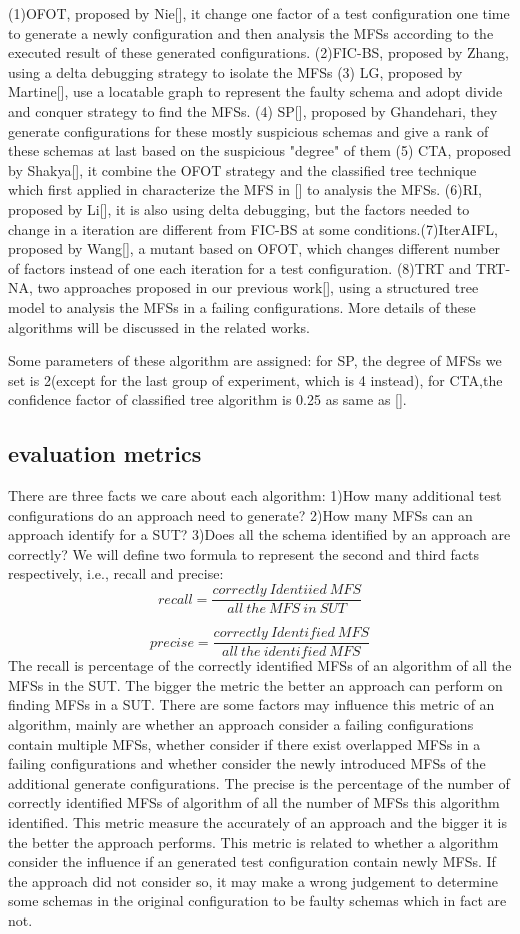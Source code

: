 \documentclass[10pt,journal,cspaper,compsoc]{IEEEtran}
\begin{document}
(1)OFOT, proposed by Nie[], it change one factor of a test configuration one time to generate a newly configuration and then analysis the MFSs according to the executed result of these generated configurations. (2)FIC-BS, proposed by Zhang, using a delta debugging strategy to isolate the MFSs (3) LG, proposed by Martine[], use a locatable graph to represent the faulty schema and adopt divide and conquer strategy to find the MFSs. (4) SP[], proposed by Ghandehari, they generate configurations for these mostly suspicious schemas and give a rank of these schemas at last based on the suspicious "degree" of them (5) CTA, proposed by Shakya[], it combine the OFOT strategy and the classified tree technique which first applied in characterize the MFS in [] to analysis the MFSs. (6)RI, proposed by Li[], it is also using delta debugging, but the factors needed to change in a iteration are different from FIC-BS at some conditions.(7)IterAIFL, proposed by Wang[], a mutant based on OFOT, which changes different number of factors instead of one each iteration for a test configuration. (8)TRT and TRT-NA, two approaches proposed in our previous work[], using a structured tree model to analysis the MFSs in a failing configurations.  More details of these algorithms will be discussed in the related works.

Some parameters of these algorithm are assigned: for SP, the degree of MFSs we set is 2(except for the last group of experiment, which is 4 instead), for CTA,the confidence factor of classified tree algorithm is 0.25 as same as [].
\subsection{evaluation metrics}
There are three facts we care about each algorithm: 1)How many additional test configurations do an approach need to generate? 2)How many MFSs can an approach identify for a SUT? 3)Does all the schema identified by an approach are correctly? We will define two formula to represent the second and third facts respectively, i.e., recall and precise:
$$recall =
 \frac{correctly\ Identiied\ MFS}{all\ the\ MFS\ in\ SUT}
$$

$$precise =
 \frac{correctly\ Identified\ MFS}{all\ the\ identified\ MFS}
$$
The recall is percentage of the correctly identified MFSs of an algorithm of all the MFSs in the SUT. The bigger the metric the better an approach can perform on finding MFSs in a SUT. There are some factors may influence this metric of an algorithm, mainly are whether an approach consider a failing configurations contain multiple MFSs, whether consider if there exist overlapped MFSs in a failing configurations and whether consider the newly introduced MFSs of the additional generate configurations.  The precise is the percentage of the number of correctly identified MFSs of algorithm of all the number of  MFSs this algorithm identified. This metric measure the accurately of an approach and the bigger it is the better the approach performs. This metric is related to whether a algorithm consider the influence if an generated test configuration contain newly MFSs. If the approach did not consider so, it may make a wrong judgement to determine some schemas in the original configuration to be faulty schemas which in fact are not.
\end{document}
